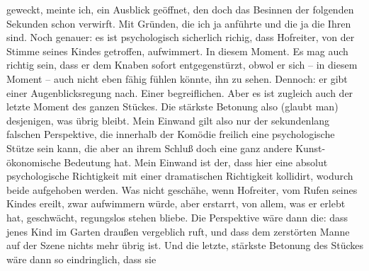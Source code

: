 \begin{ledgroupsized}[t]{13cm}
               geweckt, meinte ich, ein Ausblick geöffnet, den doch das Besinnen der folgenden
               Sekunden schon verwirft. Mit Gründen, die ich ja anführte und die ja die Ihren sind.
               Noch genauer: es ist psychologisch sicherlich richig, dass Hofreiter, von der Stimme seines Kindes
               getroffen, aufwimmert. In diesem Moment. Es mag auch richtig sein, dass er dem Knaben
               sofort entgegenstürzt, obwol er sich – in diesem Moment – auch nicht eben fähig
               fühlen könnte, ihn zu sehen. Dennoch: er gibt einer Augenblicksregung nach. Einer
               begreiflichen. Aber es ist zugleich auch der letzte Moment des ganzen Stückes. Die stärkste Betonung also (glaubt
               man) desjenigen, was übrig bleibt. Mein Einwand gilt also nur der sekundenlang
               falschen Perspektive, die innerhalb der Komödie freilich eine psychologische Stütze
               sein kann, die aber an ihrem Schluß doch eine ganz andere Kunst-ökonomische Bedeutung
               hat. Mein Einwand ist der, dass hier eine absolut psychologische Richtigkeit mit
               einer dramatischen Richtigkeit kollidirt, wodurch beide aufgehoben werden. Was nicht
               geschähe, wenn Hofreiter, vom
               Rufen seines Kindes ereilt, zwar aufwimmern würde, aber erstarrt, von allem, was er
               erlebt hat, geschwächt, regungslos stehen bliebe. Die Perspektive wäre dann die: dass
               jenes Kind im Garten draußen vergeblich ruft, und dass dem zerstörten Manne auf der
               Szene nichts mehr übrig ist. Und die letzte, stärkste Betonung des Stückes wäre dann so eindringlich, dass sie

\end{ledgroupsized}
